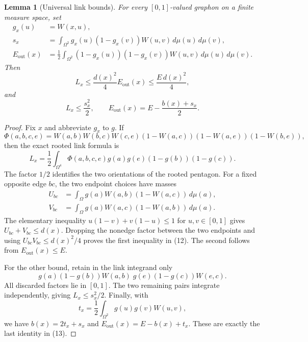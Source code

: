 \documentclass[11pt]{amsart}
\newtheorem{lemma}[theorem]{Lemma}
\theoremstyle{definition}
\theoremstyle{remark}
\begin{document}
\begin{lemma}[Universal link bounds]\label{lem:universal-links}
For every \([0,1]\)-valued graphon on a finite measure space, set
\begin{align*}
 g_x(u)&=W(x,u),\\
 s_x&=\int_{\Omega^2}g_x(u)(1-g_x(v))W(u,v)\,d\mu(u)\,d\mu(v),\\
 E_{\mathrm{out}}(x)&=\frac12\int_{\Omega^2}
       (1-g_x(u))(1-g_x(v))W(u,v)\,d\mu(u)\,d\mu(v).
\end{align*}
Then
\begin{equation}
 L_x\le\frac{d(x)^2}{4}E_{\mathrm{out}}(x)
       \le\frac{E\,d(x)^2}{4},\tag{12}
\end{equation}
and
\begin{equation}
 L_x\le\frac{s_x^2}{2},\qquad
 E_{\mathrm{out}}(x)=E-\frac{b(x)+s_x}{2}.\tag{13}
\end{equation}
\end{lemma}
\begin{proof}
Fix \(x\) and abbreviate \(g_x\) to \(g\). If
\[
 \Phi(a,b,c,e)=W(a,b)W(b,c)W(c,e)
       (1-W(a,c))(1-W(a,e))(1-W(b,e)),
\]
then the exact rooted link formula is
\[
 L_x=\frac12\int_{\Omega^4}
       \Phi(a,b,c,e)g(a)g(e)(1-g(b))(1-g(c)).
\]
The factor \(1/2\) identifies the two orientations of the rooted pentagon.
For a fixed opposite edge \(bc\), the two endpoint choices have masses
\begin{align*}
 U_{bc}&=\int_\Omega g(a)W(a,b)(1-W(a,c))\,d\mu(a),\\
 V_{bc}&=\int_\Omega g(a)W(a,c)(1-W(a,b))\,d\mu(a).
\end{align*}
The elementary inequality \(u(1-v)+v(1-u)\le1\) for \(u,v\in[0,1]\)
gives \(U_{bc}+V_{bc}\le d(x)\). Dropping the nonedge factor between
the two endpoints and using \(U_{bc}V_{bc}\le d(x)^2/4\) proves the first
inequality in (12). The second follows from \(E_{\mathrm{out}}(x)\le E\).

For the other bound, retain in the link integrand only
\[
 g(a)(1-g(b))W(a,b)\;g(e)(1-g(c))W(e,c).
\]
All discarded factors lie in \([0,1]\). The two remaining pairs integrate
independently, giving \(L_x\le s_x^2/2\). Finally, with
\[
 t_x=\frac12\int_{\Omega^2}g(u)g(v)W(u,v),
\]
we have \(b(x)=2t_x+s_x\) and
\(E_{\mathrm{out}}(x)=E-b(x)+t_x\). These are exactly the last identity
in (13).
\end{proof}
\end{document}
